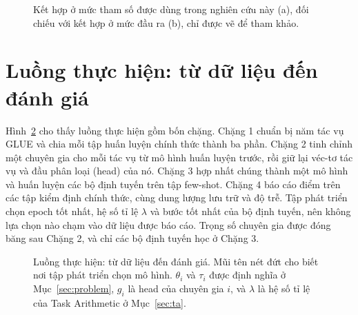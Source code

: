 \begin{figure}[htbp]
  \centering
  \resizebox{.62\linewidth}{!}{}
  \caption{Kết hợp ở mức tham số được dùng trong nghiên cứu này (a), đối chiếu với kết hợp ở mức đầu ra (b), chỉ được vẽ để tham khảo.}
  \label{fig:we}
\end{figure}

\section{Luồng thực hiện: từ dữ liệu đến đánh giá}
\label{sec:flow}

Hình~\ref{fig:flow} cho thấy luồng thực hiện gồm bốn chặng. Chặng 1 chuẩn bị năm tác vụ GLUE và chia mỗi tập huấn luyện chính thức thành ba phần. Chặng 2 tinh chỉnh một chuyên gia cho mỗi tác vụ từ mô hình huấn luyện trước, rồi giữ lại véc-tơ tác vụ và đầu phân loại (head) của nó. Chặng 3 hợp nhất chúng thành một mô hình và huấn luyện các bộ định tuyến trên tập few-shot. Chặng 4 báo cáo điểm trên các tập kiểm định chính thức, cùng dung lượng lưu trữ và độ trễ. Tập phát triển chọn epoch tốt nhất, hệ số tỉ lệ $\lambda$ và bước tốt nhất của bộ định tuyến, nên không lựa chọn nào chạm vào dữ liệu được báo cáo. Trọng số chuyên gia được đóng băng sau Chặng 2, và chỉ các bộ định tuyến học ở Chặng 3.

\begin{figure}[htbp]
  \centering
  \resizebox{.8\linewidth}{!}{}
  \caption{Luồng thực hiện: từ dữ liệu đến đánh giá. Mũi tên nét đứt cho biết nơi tập phát triển chọn mô hình. $\theta_i$ và $\tau_i$ được định nghĩa ở Mục~\ref{sec:problem}, $g_i$ là head của chuyên gia $i$, và $\lambda$ là hệ số tỉ lệ của Task Arithmetic ở Mục~\ref{sec:ta}.}
  \label{fig:flow}
\end{figure}
